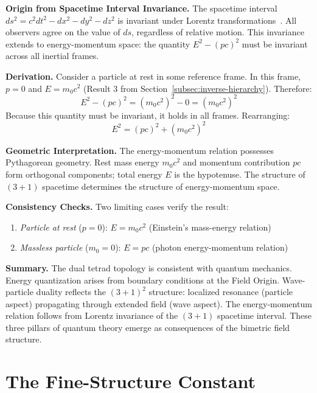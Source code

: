 \documentclass[aps,prd,preprint,superscriptaddress,showpacs,preprintnumbers,amsmath,amssymb,nofootinbib]{revtex4-2}
\begin{document}
\textbf{Origin from Spacetime Interval Invariance.}
The spacetime interval $ds^2 = c^2 dt^2 - dx^2 - dy^2 - dz^2$ is invariant under Lorentz transformations~\cite{weinberg1972}. All observers agree on the value of $ds$, regardless of relative motion. This invariance extends to energy-momentum space: the quantity $E^2 - (pc)^2$ must be invariant across all inertial frames.

\textbf{Derivation.}
Consider a particle at rest in some reference frame. In this frame, $p = 0$ and $E = m_0 c^2$ (Result 3 from Section~\ref{subsec:inverse-hierarchy}). Therefore:
\begin{equation}
E^2 - (pc)^2 = (m_0 c^2)^2 - 0 = (m_0 c^2)^2
\end{equation}
Because this quantity must be invariant, it holds in all frames. Rearranging:
\begin{equation}
E^2 = (pc)^2 + (m_0 c^2)^2
\end{equation}

\textbf{Geometric Interpretation.}
The energy-momentum relation possesses Pythagorean geometry. Rest mass energy $m_0 c^2$ and momentum contribution $pc$ form orthogonal components; total energy $E$ is the hypotenuse. The structure of $(3+1)$ spacetime determines the structure of energy-momentum space.

\textbf{Consistency Checks.}
Two limiting cases verify the result:
\begin{enumerate}
    \item \emph{Particle at rest} ($p = 0$): $E = m_0 c^2$ (Einstein's mass-energy relation)
    \item \emph{Massless particle} ($m_0 = 0$): $E = pc$ (photon energy-momentum relation)
\end{enumerate}

\textbf{Summary.}
The dual tetrad topology is consistent with quantum mechanics. Energy quantization arises from boundary conditions at the Field Origin. Wave-particle duality reflects the $(3+1)^2$ structure: localized resonance (particle aspect) propagating through extended field (wave aspect). The energy-momentum relation follows from Lorentz invariance of the $(3+1)$ spacetime interval. These three pillars of quantum theory emerge as consequences of the bimetric field structure.

\section{The Fine-Structure Constant}
\label{sec:alpha}
\end{document}
